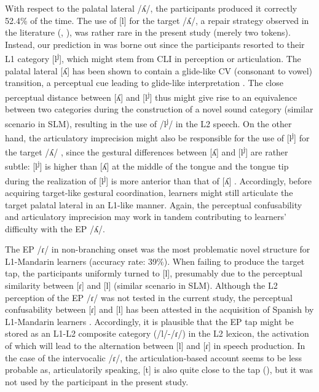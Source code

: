 \documentclass[output=paper]{../langscibook}
\begin{document}
With respect to the palatal lateral /ʎ/, the participants produced it correctly 52.4\% of the time. The use of [l] for the target /ʎ/, a repair strategy observed in the literature (\citealt{Batalha1995}, \citealt{Martins2008}), was rather rare in the present study (merely two tokens). Instead, our prediction in  was borne out since the participants resorted to their L1 category [l\textsuperscript{j}], which might stem from CLI in perception or articulation. The palatal lateral [ʎ] has been shown to contain a glide-like CV (consonant to vowel) transition, a perceptual cue leading to glide-like interpretation \citep{Colantoni2004}. The close perceptual distance between [ʎ] and [l\textsuperscript{j}] thus might give rise to an equivalence between two categories during the construction of a novel sound category (similar scenario in SLM), resulting in the use of /l\textsuperscript{j}/ in the L2 speech. On the other hand, the articulatory imprecision might also be responsible for the use of [l\textsuperscript{j}] for the target /ʎ/ \citep{Honikman1964}, since the gestural differences between [ʎ] and [l\textsuperscript{j}] are rather subtle: [l\textsuperscript{j}] is higher than [ʎ] at the middle of the tongue and the tongue tip during the realization of [l\textsuperscript{j}] is more anterior than that of [ʎ] \citep{Wong2017}. Accordingly, before acquiring target-like gestural coordination, learners might still articulate the target palatal lateral in an L1-like manner. Again, the perceptual confusability and articulatory imprecision may work in tandem contributing to learners’ difficulty with the EP /ʎ/.

The EP /ɾ/ in non-branching onset was the most problematic novel structure for L1-Mandarin learners (accuracy rate: 39\%). When failing to produce the target tap, the participants uniformly turned to [l], presumably due to the perceptual similarity between [ɾ] and [l] (similar scenario in SLM). Although the L2 perception of the EP /ɾ/ was not tested in the current study, the perceptual confusability between [ɾ] and [l] has been attested in the acquisition of Spanish by L1-Mandarin learners \citep{Chih2013}. Accordingly, it is plausible that the EP tap might be stored as an L1-L2 composite category (/l/-/ɾ/) in the L2 lexicon, the activation of which will lead to the alternation between [l] and [ɾ] in speech production. In the case of the intervocalic /ɾ/, the articulation-based account seems to be less probable as, articulatorily speaking, [t] is also quite close to the tap (\citealt{LadefogedJohnson2011}), but it was not used by the participant in the present study.
\end{document}
